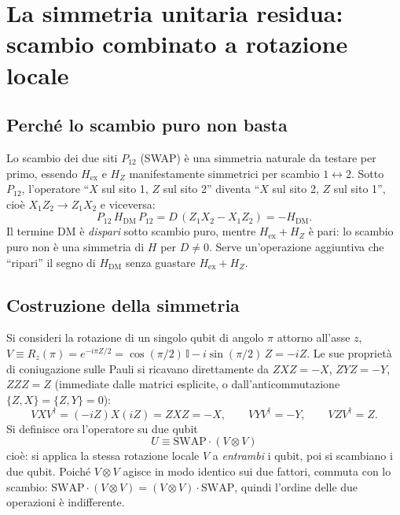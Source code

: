 \documentclass[11pt,a4paper]{article}
\begin{document}
\section{La simmetria unitaria residua: scambio combinato a rotazione locale}
\label{sec:simmetria-U}

\subsection{Perché lo scambio puro non basta}

Lo scambio dei due siti $P_{12}$ (SWAP) è una simmetria naturale da testare per primo, essendo
$H_{\mathrm{ex}}$ e $H_Z$ manifestamente simmetrici per scambio $1\leftrightarrow2$. Sotto
$P_{12}$, l'operatore ``$X$ sul sito 1, $Z$ sul sito 2'' diventa ``$X$ sul sito 2, $Z$ sul sito
1'', cioè $X_1Z_2\to Z_1X_2$ e viceversa:
\begin{equation}
P_{12}\,H_{\mathrm{DM}}\,P_{12} = D\,(Z_1X_2-X_1Z_2) = -H_{\mathrm{DM}}.
\end{equation}
Il termine DM è \emph{dispari} sotto scambio puro, mentre $H_{\mathrm{ex}}+H_Z$ è pari: lo
scambio puro non è una simmetria di $H$ per $D\neq0$. Serve un'operazione aggiuntiva che
``ripari'' il segno di $H_{\mathrm{DM}}$ senza guastare $H_{\mathrm{ex}}+H_Z$.

\subsection{Costruzione della simmetria}

Si consideri la rotazione di un singolo qubit di angolo $\pi$ attorno all'asse $z$,
$V\equiv R_z(\pi) = e^{-i\pi Z/2} = \cos(\pi/2)\,\mathbb I - i\sin(\pi/2)\,Z = -iZ$. Le sue
proprietà di coniugazione sulle Pauli si ricavano direttamente da $Z X Z = -X$, $ZYZ=-Y$,
$ZZZ=Z$ (immediate dalle matrici esplicite, o dall'anticommutazione $\{Z,X\}=\{Z,Y\}=0$):
\begin{equation}
VXV^\dagger = (-iZ)X(iZ) = ZXZ = -X, \qquad
VYV^\dagger = -Y, \qquad
VZV^\dagger = Z.
\label{eq:V-coniug}
\end{equation}
Si definisce ora l'operatore su due qubit
\begin{equation}
\boxed{U \equiv \mathrm{SWAP}\cdot(V\otimes V)}
\end{equation}
cioè: si applica la stessa rotazione locale $V$ a \emph{entrambi} i qubit, poi si scambiano i
due qubit. Poiché $V\otimes V$ agisce in modo identico sui due fattori, commuta con lo scambio:
$\mathrm{SWAP}\cdot(V\otimes V) = (V\otimes V)\cdot\mathrm{SWAP}$, quindi l'ordine delle due
operazioni è indifferente.
\end{document}
